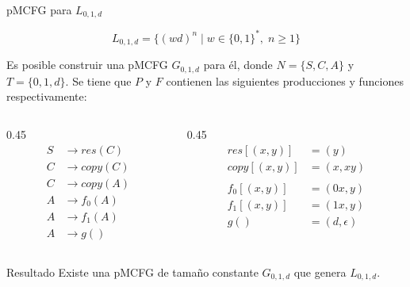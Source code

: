 \documentclass{beamer}
\newcommand{\eword}{\epsilon}
\newcommand{\gprod}{\rightarrow}
\newcommand{\repeatlang}{L_{0,1,d}}
\newcommand{\repeatgramm}{G_{0, 1, d}}
\begin{document}
\begin{frame}{pMCFG para $\repeatlang$}

    \[
        \repeatlang =
        \{(wd)^n \mid w \in \{0,1\}^*,\; n \ge 1\}
    \]

    \pause

    Es posible construir una pMCFG $\repeatgramm$ para él, donde $N = \{S, C, A\}$ y $T = \{0, 1, d\}$. Se tiene que $P$ y $F$ contienen las siguientes producciones y funciones respectivamente:

    \begin{columns}
        \begin{column}{0.45\textwidth}
            \begin{align*}
                S & \gprod res(C)  \\
                C & \gprod copy(C) \\
                C & \gprod copy(A) \\
                A & \gprod f_0(A)  \\
                A & \gprod f_1(A)  \\
                A & \gprod g()
            \end{align*}
        \end{column}
        \hfill
        \begin{column}{0.45\textwidth}
            \begin{align*}
                res[(x,y)]  & = (y)        \\
                copy[(x,y)] & = (x,xy)     \\
                \\
                f_0[(x,y)]  & = (0x,y)     \\
                f_1[(x,y)]  & = (1x,y)     \\
                g()         & = (d,\eword)
            \end{align*}
        \end{column}
    \end{columns}


    \pause

    \begin{block}{Resultado}
        Existe una pMCFG de tamaño constante
        $\repeatgramm$ que genera $\repeatlang$.
    \end{block}

\end{frame}
\end{document}
